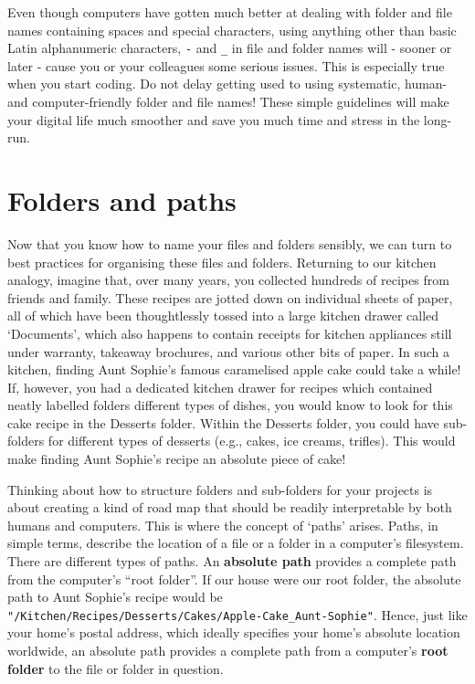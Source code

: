 \documentclass[
  letterpaper,
  DIV=11,
  numbers=noendperiod]{scrreprt}
\begin{document}
Even though computers have gotten much better at dealing with folder and
file names containing spaces and special characters, using anything
other than basic Latin alphanumeric characters, \texttt{-} and
\texttt{\_} in file and folder names will - sooner or later - cause you
or your colleagues some serious issues. This is especially true when you
start coding. Do not delay getting used to using systematic, human- and
computer-friendly folder and file names! These simple guidelines will
make your digital life much smoother and save you much time and stress
in the long-run.

\section{Folders and paths}\label{folders-and-paths}

Now that you know how to name your files and folders sensibly, we can
turn to best practices for organising these files and folders. Returning
to our kitchen analogy, imagine that, over many years, you collected
hundreds of recipes from friends and family. These recipes are jotted
down on individual sheets of paper, all of which have been thoughtlessly
tossed into a large kitchen drawer called `Documents', which also
happens to contain receipts for kitchen appliances still under warranty,
takeaway brochures, and various other bits of paper. In such a kitchen,
finding Aunt Sophie's famous caramelised apple cake could take a while!
If, however, you had a dedicated kitchen drawer for recipes which
contained neatly labelled folders different types of dishes, you would
know to look for this cake recipe in the Desserts folder. Within the
Desserts folder, you could have sub-folders for different types of
desserts (e.g., cakes, ice creams, trifles). This would make finding
Aunt Sophie's recipe an absolute piece of cake!

Thinking about how to structure folders and sub-folders for your
projects is about creating a kind of road map that should be readily
interpretable by both humans and computers. This is where the concept of
`paths' arises. Paths, in simple terms, describe the location of a file
or a folder in a computer's filesystem. There are different types of
paths. An \textbf{absolute path} provides a complete path from the
computer's ``root folder''. If our house were our root folder, the
absolute path to Aunt Sophie's recipe would be
\texttt{"/Kitchen/Recipes/Desserts/Cakes/Apple-Cake\_Aunt-Sophie"}.
Hence, just like your home's postal address, which ideally specifies
your home's absolute location worldwide, an absolute path provides a
complete path from a computer's \textbf{root folder} to the file or
folder in question.
\end{document}

